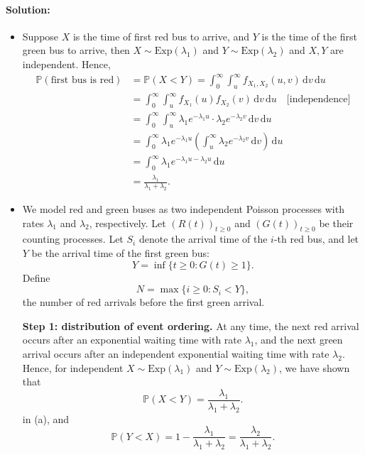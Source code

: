 \documentclass[a4paper,12pt]{article}
\begin{document}
\paragraph{Solution:}
\begin{itemize}
	\item [(a)] Suppose \(X\) is the time of first red bus to arrive, and \(Y\) is the time of the first green bus to arrive, then \(X \sim \mathrm{Exp}(\lambda _1) \) and \(Y \sim \mathrm{Exp}(\lambda _2) \) and \(X, Y\) are independent. Hence,
	\begin{align*}
		\mathbb{P} (\text{first bus is red}) &= \mathbb{P} (X < Y) = \int _{0}^{\infty } \int _u^{\infty } f_{X_1, X_2}(u, v) \, \mathrm{d} v \, \mathrm{d} u \\
		&= \int _0^{\infty} \int _u^{\infty} f_{X_1}(u) f_{X_2}(v) \, \mathrm{d} v \, \mathrm{d} u  \quad \text{[independence]} \\
		&= \int _0^{\infty } \int _u^{\infty } \lambda _1 e^{-\lambda _1 u} \cdot \lambda _2 e^{-\lambda _2 v} \, \mathrm{d} v \, \mathrm{d} u \\
		&= \int _0^{\infty } \lambda _1 e^{-\lambda _1 u} \left( \int _u^{\infty } \lambda _2 e^{-\lambda _2 v} \, \mathrm{d} v  \right) \, \mathrm{d} u \\
		&= \int _0^{\infty } \lambda _1 e^{-\lambda _1 u - \lambda _2 u} \, \mathrm{d} u \\
		&= \frac{\lambda _1}{\lambda _1 + \lambda _2}.     
	\end{align*}
	\item [(b)] We model red and green buses as two independent Poisson processes with rates $\lambda_1$ and $\lambda_2$, respectively. Let $(R(t))_{t \ge 0}$ and $(G(t))_{t \ge 0}$ be their counting processes. Let $S_i$ denote the arrival time of the $i$-th red bus, and let $Y$ be the arrival time of the first green bus:
\[
Y = \inf\{t \ge 0 : G(t) \ge 1\}.
\]
Define
\[
N = \max\{i \ge 0 : S_i < Y\},
\]
the number of red arrivals before the first green arrival.

\medskip
\noindent
\textbf{Step 1: distribution of event ordering.}
At any time, the next red arrival occurs after an exponential waiting time with rate $\lambda_1$, and the next green arrival occurs after an independent exponential waiting time with rate $\lambda_2$. Hence, for independent $X \sim \mathrm{Exp}(\lambda_1)$ and $Y \sim \mathrm{Exp}(\lambda_2)$, we have shown that
\[
\mathbb{P}(X < Y) = \frac{\lambda_1}{\lambda_1+\lambda_2}.
\]
in (a), and
\[
\mathbb{P}(Y < X) = 1 - \frac{\lambda_1}{\lambda _1 + \lambda _2} = \frac{\lambda_2}{\lambda_1+\lambda_2}.
\]


\end{itemize}
\end{document}
